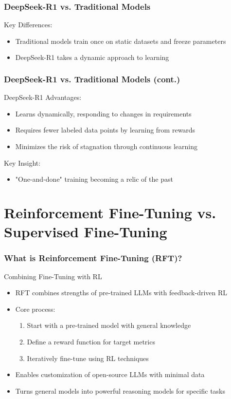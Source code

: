 \documentclass[aspectratio=169]{beamer}
\begin{document}
\begin{frame}
	\frametitle{DeepSeek-R1 vs. Traditional Models}
	\begin{block}{Key Differences:}
		\begin{itemize}
			\item Traditional models train once on static datasets and freeze parameters
			\item DeepSeek-R1 takes a dynamic approach to learning
		\end{itemize}
	\end{block}
\end{frame}

\begin{frame}
	\frametitle{DeepSeek-R1 vs. Traditional Models (cont.)}
	\begin{block}{DeepSeek-R1 Advantages:}
		\begin{itemize}
			\item Learns dynamically, responding to changes in requirements
			\item Requires fewer labeled data points by learning from rewards
			\item Minimizes the risk of stagnation through continuous learning
		\end{itemize}
	\end{block}
	\begin{block}{Key Insight:}
		\begin{itemize}
			\item "One-and-done" training becoming a relic of the past
		\end{itemize}
	\end{block}
\end{frame}

\section{Reinforcement Fine-Tuning vs. Supervised Fine-Tuning}

\begin{frame}
	\frametitle{What is Reinforcement Fine-Tuning (RFT)?}
	\begin{block}{Combining Fine-Tuning with RL}
		\begin{itemize}
			\item RFT combines strengths of pre-trained LLMs with feedback-driven RL
			\item Core process:
			\begin{enumerate}
				\item Start with a pre-trained model with general knowledge
				\item Define a reward function for target metrics
				\item Iteratively fine-tune using RL techniques
			\end{enumerate}
			\item Enables customization of open-source LLMs with minimal data
			\item Turns general models into powerful reasoning models for specific tasks
		\end{itemize}
	\end{block}
\end{frame}
\end{document}
